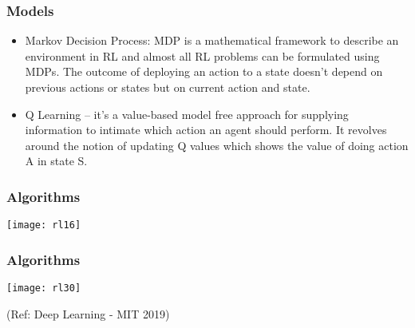 \begin{frame}[fragile]\frametitle{Models}

\begin{itemize}
\item Markov Decision Process: MDP is a mathematical framework to describe an environment in RL and almost all RL problems can be formulated using MDPs. The outcome of deploying an action to a state doesn’t depend on previous actions or states but on current action and state.
\item Q Learning – it’s a value-based model free approach for supplying information to intimate which action an agent should perform. It revolves around the notion of updating Q values which shows the value of doing action A in state S.
\end{itemize}


\end{frame}

\begin{frame}[fragile]\frametitle{Algorithms}

\begin{center}
\texttt{[image: rl16]}
\end{center}

\end{frame}

\begin{frame}[fragile]\frametitle{Algorithms}
\begin{center}
\texttt{[image: rl30]}
\end{center}

{\tiny (Ref: Deep Learning - MIT 2019)}

\end{frame}


